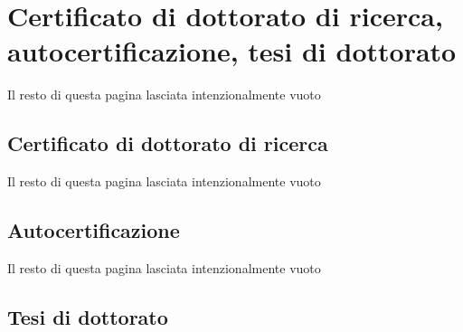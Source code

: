 \documentclass{article}
\def\lb{\vfill{Il resto di questa pagina lasciata intenzionalmente vuoto}\vfill}
\newif\ifcopy
\begin{document}


\ifcopy


% 
% 
% 
% 
% 

{\center \section{Certificato di dottorato di ricerca, autocertificazione, tesi di dottorato}}

\lb

\newpage

{\center \subsection{Certificato di dottorato di ricerca}}

\lb



{\center \subsection{Autocertificazione}}

\lb



{\center \subsection{Tesi di dottorato}}
\end{document}
